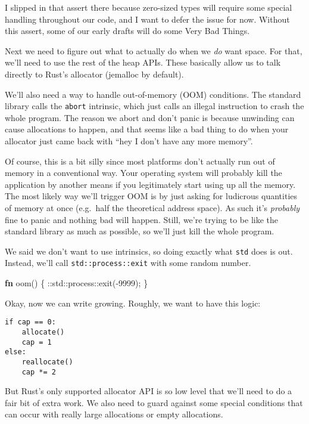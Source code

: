 \documentclass[a4paper,]{book}
\newenvironment{Shaded}{\begin{snugshade}}{\end{snugshade}}
\newcommand{\KeywordTok}[1]{\textcolor[rgb]{0.13,0.29,0.53}{\textbf{{#1}}}}
\newcommand{\DecValTok}[1]{\textcolor[rgb]{0.00,0.00,0.81}{{#1}}}
\newcommand{\NormalTok}[1]{{#1}}
\begin{document}
I slipped in that assert there because zero-sized types will require
some special handling throughout our code, and I want to defer the issue
for now. Without this assert, some of our early drafts will do some Very
Bad Things.

Next we need to figure out what to actually do when we \emph{do} want
space. For that, we'll need to use the rest of the heap APIs. These
basically allow us to talk directly to Rust's allocator (jemalloc by
default).

We'll also need a way to handle out-of-memory (OOM) conditions. The
standard library calls the \texttt{abort} intrinsic, which just calls an
illegal instruction to crash the whole program. The reason we abort and
don't panic is because unwinding can cause allocations to happen, and
that seems like a bad thing to do when your allocator just came back
with ``hey I don't have any more memory''.

Of course, this is a bit silly since most platforms don't actually run
out of memory in a conventional way. Your operating system will probably
kill the application by another means if you legitimately start using up
all the memory. The most likely way we'll trigger OOM is by just asking
for ludicrous quantities of memory at once (e.g.~half the theoretical
address space). As such it's \emph{probably} fine to panic and nothing
bad will happen. Still, we're trying to be like the standard library as
much as possible, so we'll just kill the whole program.

We said we don't want to use intrinsics, so doing exactly what
\texttt{std} does is out. Instead, we'll call
\texttt{std::process::exit} with some random number.

\begin{Shaded}
\begin{Highlighting}[]
\KeywordTok{fn} \NormalTok{oom() \{}
    \NormalTok{::std::process::exit(-}\DecValTok{9999}\NormalTok{);}
\NormalTok{\}}
\end{Highlighting}
\end{Shaded}

Okay, now we can write growing. Roughly, we want to have this logic:

\begin{verbatim}
if cap == 0:
    allocate()
    cap = 1
else:
    reallocate()
    cap *= 2
\end{verbatim}

But Rust's only supported allocator API is so low level that we'll need
to do a fair bit of extra work. We also need to guard against some
special conditions that can occur with really large allocations or empty
allocations.
\end{document}
